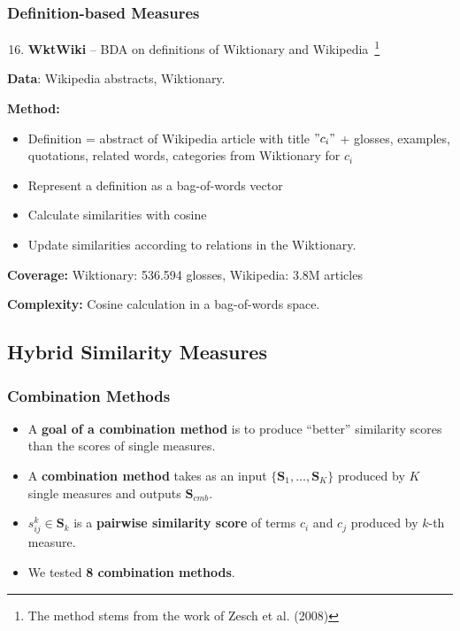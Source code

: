 \documentclass{beamer}
\begin{document}
\begin{frame}
\frametitle{Definition-based Measures}

\begin{enumerate}
 \setcounter{enumi}{15} 
\item \textbf{WktWiki} -- BDA on definitions of Wiktionary and Wikipedia~\footnote{The method stems from the work of Zesch et al. (2008)}

\end{enumerate}

\textbf{Data}: Wikipedia abstracts, Wiktionary.

\textbf{Method:}
\begin{itemize}
  \item Definition = abstract of Wikipedia article with title $"c_i"$ + 
   glosses, examples, quotations, related words, categories from Wiktionary  for $c_i$
   \item Represent a definition as a bag-of-words vector
   \item Calculate similarities with cosine
   \item Update similarities according to relations in the Wiktionary.
  
\end{itemize}
   \textbf{Coverage:} Wiktionary: 536.594 glosses, Wikipedia: 3.8M articles
   
   \textbf{Complexity:} Cosine calculation in a bag-of-words space. 
  
\end{frame}


\subsection{Hybrid Similarity Measures}

\begin{frame}
\frametitle{Combination Methods}
\begin{itemize}
\item A \textbf{goal of a combination method} is to produce ``better'' similarity scores than the
scores of single measures.

\item A \textbf{combination method} takes as an input   
$\{\mathbf{S}_1,\ldots,\mathbf{S}_K\}$ produced by $K$ single measures and
outputs  $\mathbf{S}_{cmb}$.

\item $s_{ij}^k \in \mathbf{S}_k$ is a \textbf{pairwise similarity score} of terms $c_i$ and $c_j$ produced by $k$-th measure.

\item We tested \textbf{8  combination methods}.

\end{itemize}
\end{frame}
\end{document}
